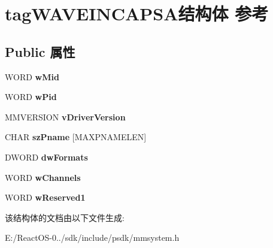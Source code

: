 \hypertarget{structtag_w_a_v_e_i_n_c_a_p_s_a}{}\section{tag\+W\+A\+V\+E\+I\+N\+C\+A\+P\+S\+A结构体 参考}
\label{structtag_w_a_v_e_i_n_c_a_p_s_a}
\subsection*{Public 属性}
\begin{DoxyCompactItemize}
\item 
\mbox{\label{structtag_w_a_v_e_i_n_c_a_p_s_a_afcaacb848ef4a1099337b806d51743e6}} 
W\+O\+RD {\bfseries w\+Mid}
\item 
\mbox{\label{structtag_w_a_v_e_i_n_c_a_p_s_a_ad9c8ee46545b12aed4258510fdd9d05c}} 
W\+O\+RD {\bfseries w\+Pid}
\item 
\mbox{\label{structtag_w_a_v_e_i_n_c_a_p_s_a_a36a05de4685e70602d2bf95d361c2aa9}} 
M\+M\+V\+E\+R\+S\+I\+ON {\bfseries v\+Driver\+Version}
\item 
\mbox{\label{structtag_w_a_v_e_i_n_c_a_p_s_a_a9d7843516459a157387b9334cc2c0ca7}} 
C\+H\+AR {\bfseries sz\+Pname} \mbox{[}M\+A\+X\+P\+N\+A\+M\+E\+L\+EN\mbox{]}
\item 
\mbox{\label{structtag_w_a_v_e_i_n_c_a_p_s_a_a3eabc2ff86155067775135cd166a9abe}} 
D\+W\+O\+RD {\bfseries dw\+Formats}
\item 
\mbox{\label{structtag_w_a_v_e_i_n_c_a_p_s_a_a2b28e177b0dc8d87a52835d53b366863}} 
W\+O\+RD {\bfseries w\+Channels}
\item 
\mbox{\label{structtag_w_a_v_e_i_n_c_a_p_s_a_af73ac15112abc2a1fc3638e850c688c6}} 
W\+O\+RD {\bfseries w\+Reserved1}
\end{DoxyCompactItemize}


该结构体的文档由以下文件生成\+:\begin{DoxyCompactItemize}
\item 
E\+:/\+React\+O\+S-\/0../sdk/include/psdk/mmsystem.\+h\end{DoxyCompactItemize}
